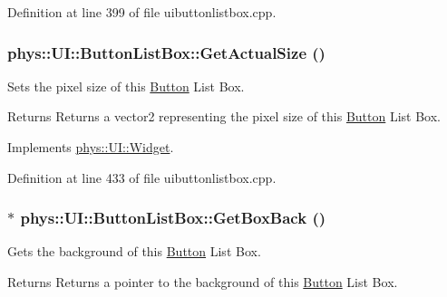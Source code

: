 Definition at line 399 of file uibuttonlistbox.cpp.

\hypertarget{classphys_1_1UI_1_1ButtonListBox_a77d992f8858bf9b9eeb190dd1ea8a4fd}{
\subsubsection[{GetActualSize}]{ phys::UI::ButtonListBox::GetActualSize ()}}
\label{d4/dd7/classphys_1_1UI_1_1ButtonListBox_a77d992f8858bf9b9eeb190dd1ea8a4fd}


Sets the pixel size of this \hyperlink{classphys_1_1UI_1_1Button}{Button} List Box. 

\begin{DoxyReturn}{Returns}
Returns a vector2 representing the pixel size of this \hyperlink{classphys_1_1UI_1_1Button}{Button} List Box. 
\end{DoxyReturn}


Implements \hyperlink{classphys_1_1UI_1_1Widget_af3a685621ed220748c0940ea38c96ed2}{phys::UI::Widget}.



Definition at line 433 of file uibuttonlistbox.cpp.

\hypertarget{classphys_1_1UI_1_1ButtonListBox_a043ce9d76af4538043551bf508811b12}{
\subsubsection[{GetBoxBack}]{ $\ast$ phys::UI::ButtonListBox::GetBoxBack ()}}
\label{d4/dd7/classphys_1_1UI_1_1ButtonListBox_a043ce9d76af4538043551bf508811b12}


Gets the background of this \hyperlink{classphys_1_1UI_1_1Button}{Button} List Box. 

\begin{DoxyReturn}{Returns}
Returns a pointer to the background of this \hyperlink{classphys_1_1UI_1_1Button}{Button} List Box. 
\end{DoxyReturn}


